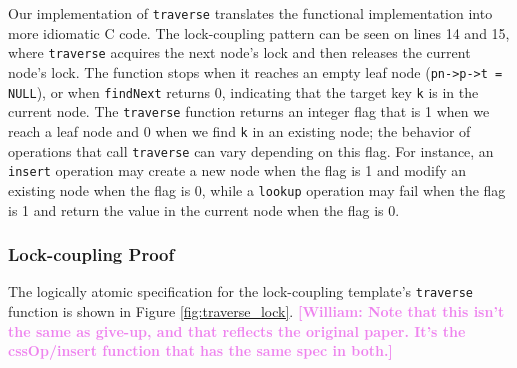 \documentclass[a4paper,UKenglish,cleveref, autoref, thm-restate]{lipics-v2021}
\newcommand{\than}[1]{\textbf{\textcolor{blue}{[Than: #1]}}}
\newcommand{\wm}[1]{\textbf{\textcolor{violet}{[William: #1]}}}
\begin{document}
Our implementation of \lstinline{traverse} translates the functional implementation into more idiomatic C code. The lock-coupling pattern can be seen on lines 14 and 15, where \lstinline{traverse} acquires the next node's lock and then releases the current node's lock. The function stops when it reaches an empty leaf node (\lstinline{pn->p->t = NULL}), or when \lstinline{findNext} returns 0, indicating that the target key \lstinline{k} is in the current node. The \lstinline{traverse} function returns an integer flag that is 1 when we reach a leaf node and 0 when we find \lstinline{k} in an existing node; the behavior of operations that call \lstinline{traverse} can vary depending on this flag. For instance, an \lstinline{insert} operation may create a new node when the flag is 1 and modify an existing node when the flag is 0, while a \lstinline{lookup} operation may fail when the flag is 1 and return the value in the current node when the flag is 0.


\subsubsection{Lock-coupling Proof}
\label{traverse_proof_lock}

The logically atomic specification for the lock-coupling template's \lstinline{traverse} function is shown in Figure \ref{fig:traverse_lock}. \wm{Note that this isn't the same as give-up, and that reflects the original paper. It's the cssOp/insert function that has the same spec in both.}
\end{document}
